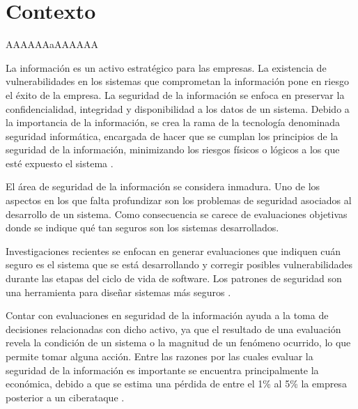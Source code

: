 
\section{Contexto}

AAAAAAaAAAAAA

La información es un activo estratégico para las empresas. La existencia de vulnerabilidades en los sistemas que comprometan la información pone en riesgo el éxito de la empresa. La seguridad de la información se enfoca en preservar la confidencialidad, integridad y disponibilidad a los datos de un sistema. Debido a la importancia de la información, se crea la rama de la tecnología denominada seguridad informática, encargada de hacer que se cumplan los principios de la seguridad de la información, minimizando los riesgos físicos o lógicos a los que esté expuesto el sistema \cite{Var14, Wyl03,Urb16}.

\vspace{0.3cm}

El área de seguridad de la información se considera inmadura. Uno de los aspectos en los que falta profundizar son  los problemas de seguridad  asociados al desarrollo de un sistema. Como consecuencia se carece de evaluaciones objetivas donde se indique qué tan seguros son los sistemas desarrollados. 

\vspace{0.3cm}

Investigaciones recientes se enfocan en generar evaluaciones que indiquen cuán seguro es el sistema que se está desarrollando y corregir posibles vulnerabilidades durante las etapas del ciclo de vida de software. Los patrones de seguridad son una herramienta para diseñar sistemas más seguros \cite{OrtGarFer11,Var1103, JahWMe10}.

\vspace{0.3cm}

Contar con evaluaciones en seguridad de la información ayuda a la toma de decisiones relacionadas con dicho activo, ya que el resultado de una evaluación revela la condición de un sistema o la magnitud de un fenómeno ocurrido, lo que permite tomar alguna acción. Entre las razones por las cuales evaluar la seguridad de la información es importante se encuentra principalmente la económica, debido a que se estima una pérdida de entre el 1\% al 5\% la empresa posterior a un ciberataque \cite{AtzLio0605,Var1103,BroHin1304}. 

